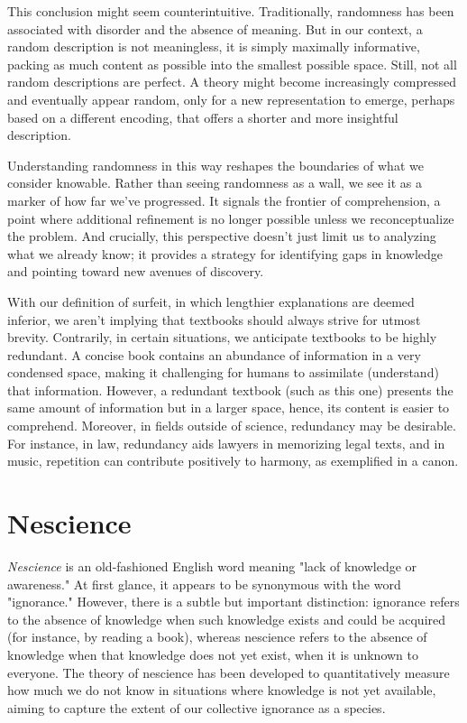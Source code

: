 This conclusion might seem counterintuitive. Traditionally, randomness has been associated with disorder and the absence of meaning. But in our context, a random description is not meaningless, it is simply maximally informative, packing as much content as possible into the smallest possible space. Still, not all random descriptions are perfect. A theory might become increasingly compressed and eventually appear random, only for a new representation to emerge, perhaps based on a different encoding, that offers a shorter and more insightful description.

Understanding randomness in this way reshapes the boundaries of what we consider knowable. Rather than seeing randomness as a wall, we see it as a marker of how far we've progressed. It signals the frontier of comprehension, a point where additional refinement is no longer possible unless we reconceptualize the problem. And crucially, this perspective doesn't just limit us to analyzing what we already know; it provides a strategy for identifying gaps in knowledge and pointing toward new avenues of discovery.

With our definition of surfeit, in which lengthier explanations are deemed inferior, we aren't implying that textbooks should always strive for utmost brevity. Contrarily, in certain situations, we anticipate textbooks to be highly redundant. A concise book contains an abundance of information in a very condensed space, making it challenging for humans to assimilate (understand) that information. However, a redundant textbook (such as this one) presents the same amount of information but in a larger space, hence, its content is easier to comprehend. Moreover, in fields outside of science, redundancy may be desirable. For instance, in law, redundancy aids lawyers in memorizing legal texts, and in music, repetition can contribute positively to harmony, as exemplified in a canon.

%
%

\section{Nescience}
\label{sec:ch1_nescience}

\emph{Nescience} is an old-fashioned English word meaning "lack of knowledge or awareness." At first glance, it appears to be synonymous with the word "ignorance." However, there is a subtle but important distinction: ignorance refers to the absence of knowledge when such knowledge exists and could be acquired (for instance, by reading a book), whereas nescience refers to the absence of knowledge when that knowledge does not yet exist, when it is unknown to everyone. The theory of nescience has been developed to quantitatively measure how much we do not know in situations where knowledge is not yet available, aiming to capture the extent of our collective ignorance as a species.

